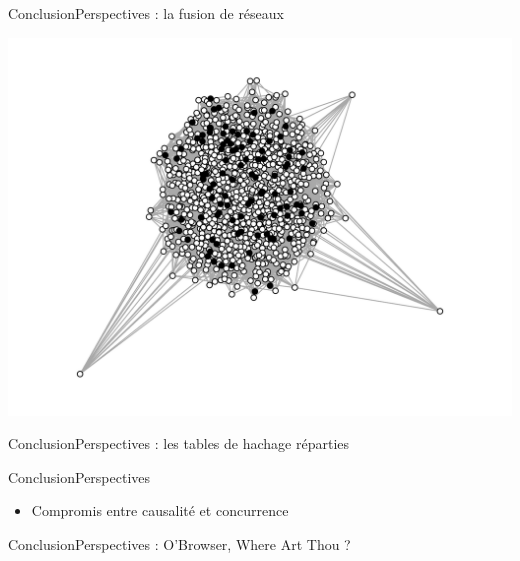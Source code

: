 \begin{frame}{Conclusion}{Perspectives : la fusion de réseaux}
\begin{minipage}{0.325\textwidth}
    \includegraphics[width=1.2\textwidth]{img/graphC.png}
  \end{minipage}

\end{frame}

\begin{frame}{Conclusion}{Perspectives : les tables de hachage réparties}


  


  \begin{center}
    
  \end{center}

\end{frame}

\begin{frame}{Conclusion}{Perspectives}
  \begin{itemize}
  \item Compromis entre causalité et concurrence
  \end{itemize}
\end{frame}


\begin{frame}{Conclusion}{Perspectives : O'Browser, Where Art Thou ?}

  \begin{center}
    
  \end{center}

\end{frame}
